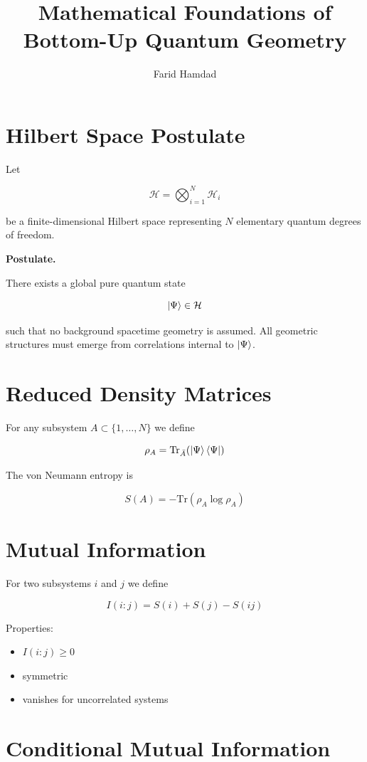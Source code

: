 \documentclass[11pt,a4paper]{article}
\title{Mathematical Foundations of Bottom-Up Quantum Geometry}
\author{Farid Hamdad}
\date{}
\begin{document}
\maketitle

\section{Hilbert Space Postulate}

Let

\[
\mathcal{H} = \bigotimes_{i=1}^{N} \mathcal{H}_i
\]

be a finite-dimensional Hilbert space representing $N$ elementary quantum degrees of freedom.

\textbf{Postulate.}

There exists a global pure quantum state

\[
\ket{\Psi} \in \mathcal{H}
\]

such that no background spacetime geometry is assumed.  
All geometric structures must emerge from correlations internal to $\ket{\Psi}$.

\section{Reduced Density Matrices}

For any subsystem $A \subset \{1,\dots,N\}$ we define

\[
\rho_A = \mathrm{Tr}_{\bar A}(\ket{\Psi}\bra{\Psi})
\]

The von Neumann entropy is

\[
S(A) = -\mathrm{Tr}(\rho_A \log \rho_A)
\]

\section{Mutual Information}

For two subsystems $i$ and $j$ we define

\[
I(i:j) = S(i) + S(j) - S(ij)
\]

Properties:

\begin{itemize}
\item $I(i:j) \ge 0$
\item symmetric
\item vanishes for uncorrelated systems
\end{itemize}

\section{Conditional Mutual Information}
\end{document}

